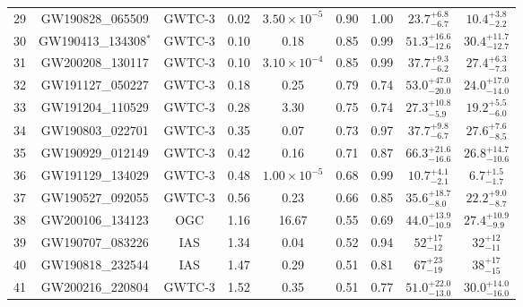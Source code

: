 \begin{table*}[ht]
\begin{tabular}{!{\vrule width 1pt}lcccccccc!{\vrule width 1pt}}
29 & GW190828\_065509 & GWTC-3 & 0.02 & $3.50 \times 10^{-5}$ & 0.90 & 1.00 & $23.7^{+6.8}_{-6.7}$ & $10.4^{+3.8}_{-2.2}$ \\
30 & GW190413\_134308$^{*}$ & GWTC-3 & 0.10 & 0.18 & 0.85 & 0.99 & $51.3^{+16.6}_{-12.6}$ & $30.4^{+11.7}_{-12.7}$ \\
31 & GW200208\_130117 & GWTC-3 & 0.10 & $3.10 \times 10^{-4}$ & 0.85 & 0.99 & $37.7^{+9.3}_{-6.2}$ & $27.4^{+6.3}_{-7.3}$ \\
32 & GW191127\_050227 & GWTC-3 & 0.18 & 0.25 & 0.79 & 0.74 & $53.0^{+47.0}_{-20.0}$ & $24.0^{+17.0}_{-14.0}$ \\
33 & GW191204\_110529 & GWTC-3 & 0.28 & 3.30 & 0.75 & 0.74 & $27.3^{+10.8}_{-5.9}$ & $19.2^{+5.5}_{-6.0}$ \\
34 & GW190803\_022701 & GWTC-3 & 0.35 & 0.07 & 0.73 & 0.97 & $37.7^{+9.8}_{-6.7}$ & $27.6^{+7.6}_{-8.5}$ \\
35 & GW190929\_012149 & GWTC-3 & 0.42 & 0.16 & 0.71 & 0.87 & $66.3^{+21.6}_{-16.6}$ & $26.8^{+14.7}_{-10.6}$ \\
36 & GW191129\_134029 & GWTC-3 & 0.48 & $1.00 \times 10^{-5}$ & 0.68 & 0.99 & $10.7^{+4.1}_{-2.1}$ & $6.7^{+1.5}_{-1.7}$ \\
37 & GW190527\_092055 & GWTC-3 & 0.56 & 0.23 & 0.66 & 0.85 & $35.6^{+18.7}_{-8.0}$ & $22.2^{+9.0}_{-8.7}$ \\
38 & GW200106\_134123 & OGC & 1.16 & 16.67 & 0.55 & 0.69 & $44.0^{+13.9}_{-10.9}$ & $27.4^{+10.9}_{-9.9}$ \\
39 & GW190707\_083226 & IAS & 1.34 & 0.04 & 0.52 & 0.94 & $52_{-12}^{+17}$ & $32_{-11}^{+12}$ \\
40 & GW190818\_232544 & IAS & 1.47 & 0.29 & 0.51 & 0.81 & $67_{-19}^{+23}$ & $38_{-15}^{+17}$ \\
41 & GW200216\_220804 & GWTC-3 & 1.52 & 0.35 & 0.51 & 0.77 & $51.0^{+22.0}_{-13.0}$ & $30.0^{+14.0}_{-16.0}$ \\
\bottomrule[1pt]
\end{tabular}

\end{table*}
